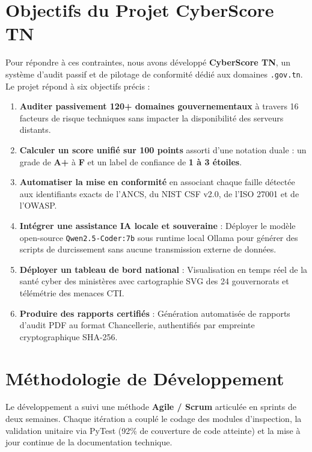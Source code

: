 \section{Objectifs du Projet CyberScore TN}
Pour répondre à ces contraintes, nous avons développé \textbf{CyberScore TN}, un système d'audit passif et de pilotage de conformité dédié aux domaines \texttt{.gov.tn}. Le projet répond à six objectifs précis :
\begin{enumerate}
    \item \textbf{Auditer passivement 120+ domaines gouvernementaux} à travers 16 facteurs de risque techniques sans impacter la disponibilité des serveurs distants.
    \item \textbf{Calculer un score unifié sur 100 points} assorti d'une notation duale : un grade de \textbf{A+} à \textbf{F} et un label de confiance de \textbf{1 à 3 étoiles}.
    \item \textbf{Automatiser la mise en conformité} en associant chaque faille détectée aux identifiants exacts de l'ANCS, du NIST CSF v2.0, de l'ISO 27001 et de l'OWASP.
    \item \textbf{Intégrer une assistance IA locale et souveraine} : Déployer le modèle open-source \texttt{Qwen2.5-Coder:7b} sous runtime local Ollama \cite{qwen2024} pour générer des scripts de durcissement sans aucune transmission externe de données.
    \item \textbf{Déployer un tableau de bord national} : Visualisation en temps réel de la santé cyber des ministères avec cartographie SVG des 24 gouvernorats et télémétrie des menaces CTI.
    \item \textbf{Produire des rapports certifiés} : Génération automatisée de rapports d'audit PDF au format Chancellerie, authentifiés par empreinte cryptographique SHA-256.
\end{enumerate}

\section{Méthodologie de Développement}
Le développement a suivi une méthode \textbf{Agile / Scrum} articulée en sprints de deux semaines. Chaque itération a couplé le codage des modules d'inspection, la validation unitaire via PyTest (92\% de couverture de code atteinte) et la mise à jour continue de la documentation technique.

